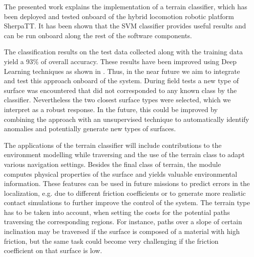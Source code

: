 \documentclass{article}
\begin{document}
The presented work explains the implementation of a terrain classifier, which has been deployed and tested onboard of the hybrid locomotion robotic platform SherpaTT.
It has been shown that the SVM classifier provides useful results and can be run onboard along the rest of the software components.

The classification results on the test data collected along with the training data yield a 93\% of overall accuracy. 
These results have been improved using Deep Learning techniques as shown in \cite{ugenti2021}. 
Thus, in the near future we aim to integrate and test this approach onboard of the system.
During field tests a new type of surface was encountered that did not corresponded to any known class by the classifier. 
Nevertheless the two closest surface types were selected, which we interpret as a robust response.
In the future, this could be improved by combining the approach with an unsupervised technique to automatically identify anomalies and potentially generate new types of surfaces.

The applications of the terrain classifier will include contributions to the environment modelling while traversing and the use of the terrain class to adapt various navigation settings.
Besides the final class of terrain, the module computes physical properties of the surface and yields valuable environmental information. 
These features can be used in future missions to predict errors in the localization, e.g. due to different friction coefficients or to generate more realistic contact simulations to further improve the control of the system.
The terrain type has to be taken into account, when setting the costs for the potential paths traversing the corresponding regions. 
For instance, paths over a slope of certain inclination may be traversed if the surface is composed of a material with high friction, but the same task could become very challenging if the friction coefficient on that surface is low. \\





\end{document}

